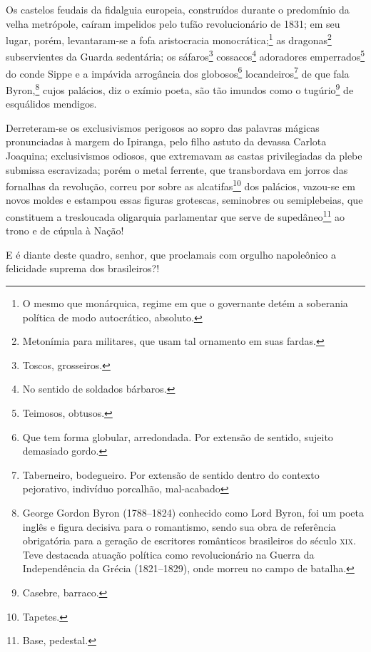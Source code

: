 Os castelos feudais da fidalguia europeia, construídos durante o
predomínio da velha metrópole, caíram impelidos pelo tufão
revolucionário de 1831; em seu lugar, porém, levantaram-se a fofa
aristocracia monocrática;\footnote{O mesmo que monárquica, regime em
  que o governante detém a soberania política de modo autocrático,
  absoluto.} as dragonas\footnote{Metonímia para militares, que usam
  tal ornamento em suas fardas.} subservientes da Guarda sedentária; os
sáfaros\footnote{Toscos, grosseiros.} cossacos\footnote{No sentido
  de soldados bárbaros.} adoradores emperrados\footnote{Teimosos,
  obtusos.} do conde Sippe e a impávida arrogância dos
globosos\footnote{Que tem forma globular, arredondada. Por extensão de
  sentido, sujeito demasiado gordo.} locandeiros\footnote{Taberneiro,
  bodegueiro. Por extensão de sentido dentro do contexto pejorativo,
  indivíduo porcalhão, mal-acabado} de que fala Byron,\footnote{George
  Gordon Byron (1788--1824) conhecido como Lord Byron, foi um poeta
  inglês e figura decisiva para o romantismo, sendo sua obra de
  referência obrigatória para a geração de escritores românticos
  brasileiros do século \textsc{xix}. Teve destacada atuação política como
  revolucionário na Guerra da Independência da Grécia (1821--1829), onde
  morreu no campo de batalha.} cujos palácios, diz o exímio poeta, são
tão imundos como o tugúrio\footnote{Casebre, barraco.} de esquálidos
mendigos.

Derreteram-se os exclusivismos perigosos ao sopro das palavras mágicas
pronunciadas à margem do Ipiranga, pelo filho astuto da devassa Carlota
Joaquina; exclusivismos odiosos, que extremavam as castas privilegiadas
da plebe submissa escravizada; porém o metal ferrente, que transbordava
em jorros das fornalhas da revolução, correu por sobre as
alcatifas\footnote{Tapetes.} dos palácios, vazou-se em novos moldes e
estampou essas figuras grotescas, seminobres ou semiplebeias, que
constituem a tresloucada oligarquia parlamentar que serve de
supedâneo\footnote{Base, pedestal.} ao trono e de cúpula à Nação!

E é diante deste quadro, senhor, que proclamais com orgulho napoleônico
a felicidade suprema dos brasileiros?!

